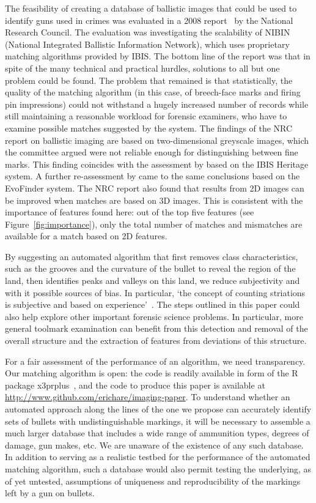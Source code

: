 \documentclass[aoas, preprint]{imsart}\usepackage[]{graphicx}\usepackage[]{color}
\begin{document}
The feasibility of creating a database of ballistic images that could be used to identify guns used in crimes was evaluated in a 2008 report~\citep{nap:2008} by the National Research Council. The evaluation was investigating the scalability of NIBIN (National Integrated Ballistic Information Network), which uses proprietary matching algorithms provided by IBIS. The bottom line of the report was that in spite of the many technical and practical hurdles, solutions to all but one problem could be found. The problem that remained is that statistically, the quality of the matching algorithm (in this case, of breech-face marks and firing pin impressions) could not withstand a hugely increased number of records while still maintaining a reasonable workload for forensic examiners, who have to examine possible matches suggested by the system. 
The findings of the NRC report on ballistic imaging are based on two-dimensional greyscale images, which the committee argued were not reliable enough for distinguishing between fine marks. This finding coincides with the assessment by \citet{dekinder:2004} based on the IBIS Heritage system. A further re-assessment by \citet{deceuster:2015} came to the same conclusions based on the EvoFinder system. 
The NRC report also found that results from 2D images can be improved when matches are based on 3D images. This is consistent with the importance of features found here: out of the top five features (see Figure~\ref{fig:importance}), only the total number of matches and mismatches are available for a match based on 2D features.

By suggesting an automated algorithm that first removes class characteristics, such as the grooves and the curvature of the bullet to reveal the region of the  land, then identifies peaks and valleys on this land, we reduce subjectivity and with it possible sources of bias. In particular, `the concept of counting striations is subjective and based on experience'~\citep{miller:1998}. The steps outlined in this paper could also help explore other important forensic science problems. In particular, more general toolmark examination can benefit from this detection and removal of the overall structure and the extraction of features from deviations of this structure.

For a fair assessment of the performance of an algorithm, we need transparency. Our matching  algorithm is open: the code is readily available in form of the R package x3prplus~\citep{x3prplus}, and the code to produce this paper is available at \url{http://www.github.com/erichare/imaging-paper}. To understand whether an automated approach along the lines of the one we propose can accurately identify sets of bullets with undistinguishable markings, it will be necessary to assemble a much larger database that includes a wide range of ammunition types, degrees of damage, gun makes, etc. We are unaware of the existence of any such database. In addition to serving as a realistic testbed for the performance of the automated matching algorithm, such a database would also permit testing the underlying, as of yet untested, assumptions of uniqueness and reproducibility of the markings left by a gun on bullets.
\end{document}
